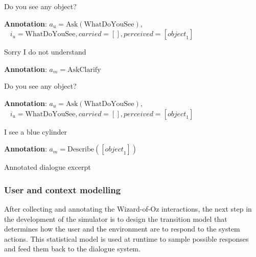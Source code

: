 \begin{Transcript}[p]
\begin{dialogue}
 Do you see any object? \\[1mm] 
\begin{footnotesize}\textbf{Annotation}: $a_u\!=\!\mathrm{Ask(WhatDoYouSee)},$\\ $\phantom{1}$ \hspace{16mm}$ i_u\!=\!\mathrm{WhatDoYouSee},\mathit{carried}\!=\![],\mathit{perceived}\!=\![\mathit{object}_1]$ \end{footnotesize} \vspace{3mm}
 Sorry I do not understand \\[1mm]
\begin{footnotesize}\textbf{Annotation}: $a_m\!=\!\mathrm{AskClarify}$ \end{footnotesize}\vspace{3mm}
 Do you see any object? \\[1mm]
\begin{footnotesize}\textbf{Annotation}: $a_u\!=\!\mathrm{Ask(WhatDoYouSee)}, $ \\ $\phantom{1}$ \hspace{16mm}$i_u\!=\! \mathrm{WhatDoYouSee}, \mathit{carried}\!=\![],\mathit{perceived}\!=\![\mathit{object}_1]$\end{footnotesize} \vspace{3mm}
 I see a blue cylinder \\[1mm]
\begin{footnotesize}\textbf{Annotation}: $a_m\!=\!\mathrm{Describe}([\mathit{object}_1])$ \end{footnotesize} \vspace{1mm}
\end{dialogue}
\caption{Annotated dialogue excerpt}
\end{Transcript}


\subsubsection*{User and context modelling}

After collecting and annotating the Wizard-of-Oz interactions, the next step in the development of the simulator is to design the transition model that determines how the user and the environment are to respond to the system actions. This statistical model is used at runtime to sample possible responses and feed them back to the dialogue system. 

